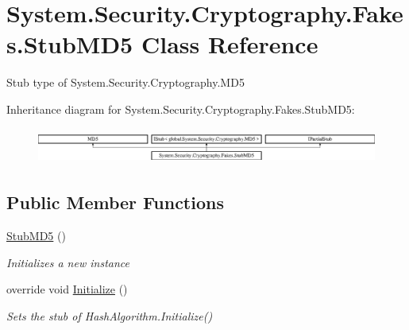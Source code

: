 \hypertarget{class_system_1_1_security_1_1_cryptography_1_1_fakes_1_1_stub_m_d5}{\section{System.\-Security.\-Cryptography.\-Fakes.\-Stub\-M\-D5 Class Reference}
\label{class_system_1_1_security_1_1_cryptography_1_1_fakes_1_1_stub_m_d5}
}


Stub type of System.\-Security.\-Cryptography.\-M\-D5 


Inheritance diagram for System.\-Security.\-Cryptography.\-Fakes.\-Stub\-M\-D5\-:\begin{figure}[H]
\begin{center}
\leavevmode
\includegraphics[height=1.188960cm]{class_system_1_1_security_1_1_cryptography_1_1_fakes_1_1_stub_m_d5}
\end{center}
\end{figure}
\subsection*{Public Member Functions}
\begin{DoxyCompactItemize}
\item 
\hyperlink{class_system_1_1_security_1_1_cryptography_1_1_fakes_1_1_stub_m_d5_a43978e34b23cf814188d10f04a85b199}{Stub\-M\-D5} ()
\begin{DoxyCompactList}\small\item\em Initializes a new instance\end{DoxyCompactList}\item 
override void \hyperlink{class_system_1_1_security_1_1_cryptography_1_1_fakes_1_1_stub_m_d5_a47f17ddeac68f55233a4c99d8a970ff6}{Initialize} ()
\begin{DoxyCompactList}\small\item\em Sets the stub of Hash\-Algorithm.\-Initialize()\end{DoxyCompactList}\end{DoxyCompactItemize}
